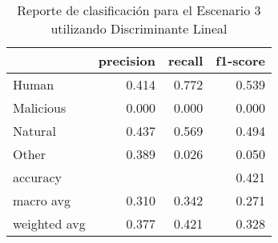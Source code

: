 \begin{table}
\centering
\caption{Reporte de clasificación para el Escenario 3 utilizando Discriminante Lineal}
\label{tab:DL_Escenario 3}
\begin{tabular}{lrrr}
\toprule
{} &  precision &  recall &  f1-score \\
\midrule
Human        &      0.414 &   0.772 &     0.539 \\
Malicious    &      0.000 &   0.000 &     0.000 \\
Natural      &      0.437 &   0.569 &     0.494 \\
Other        &      0.389 &   0.026 &     0.050 \\
accuracy     &            &         &     0.421 \\
macro avg    &      0.310 &   0.342 &     0.271 \\
weighted avg &      0.377 &   0.421 &     0.328 \\
\bottomrule
\end{tabular}
\end{table}

